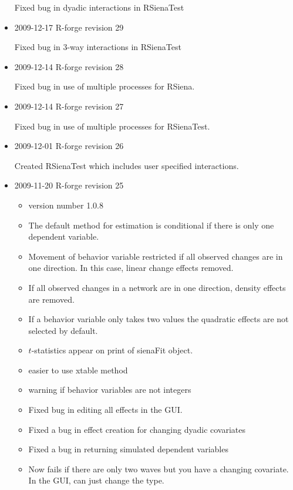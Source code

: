 \documentclass[a4paper,fleqn,11pt]{article}
\newcommand{\+}{\, + \,}
\newcommand{\sfn}[1]{\textsf{#1}}
\begin{document}
\begin{small}
\begin{itemize}
Fixed bug in dyadic interactions in \textsf{RSienaTest}

\item 2009-12-17 R-forge revision 29

Fixed bug in 3-way interactions in \textsf{RSienaTest}

\item 2009-12-14 R-forge revision 28

 Fixed bug in use of multiple processes for RSiena.

\item 2009-12-14 R-forge revision 27

Fixed bug in use of multiple processes for
  \textsf{RSienaTest}.

\item 2009-12-01 R-forge revision 26

Created \textsf{RSienaTest} which includes user
  specified interactions.

\item 2009-11-20 R-forge revision 25

  \begin{itemize}
  \item  version number 1.0.8
  \item The default method for estimation is conditional if there is only one
    dependent variable.
  \item Movement of behavior variable restricted if all observed changes are in
    one direction. In this case, linear change effects removed.
  \item If all observed changes in a network are in one direction, density
    effects are removed.
  \item If a behavior variable only takes two values the quadratic effects
    are not selected by default.
  \item $t$-statistics appear on print of \sfn{sienaFit} object.
  \item easier to use \sfn{xtable} method
  \item warning if behavior variables are not integers
  \item Fixed bug in editing all effects in the GUI.
  \item Fixed a bug in effect creation for changing dyadic covariates
  \item Fixed a bug in returning simulated dependent variables
  \item Now fails if there are only two waves but you have a changing
    covariate. In the GUI, can just change the type.
  \end{itemize}


\end{itemize}
\end{small}
\end{document}
